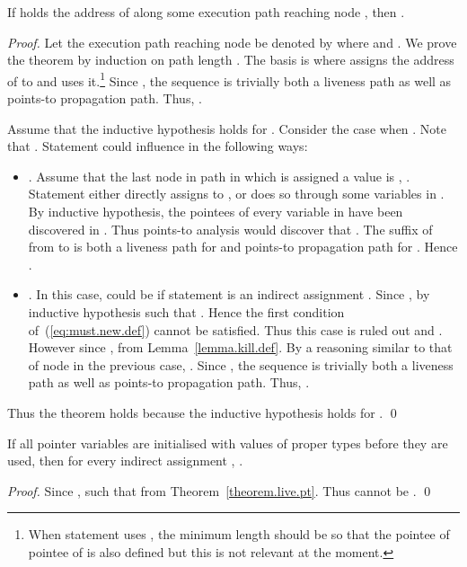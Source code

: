 \documentclass{llncs}
\newcommand{\pointer}{\text{\sf\bfseries\em P}\xspace}
\newcommand{\pt}[2]{\text{}}
\begin{document}
\begin{theorem}
\label{theorem.live.pt}
If \text{} holds the address of \text{}
along some execution path reaching node , then \text{}.
\end{theorem}
\begin{proof}
Let the execution path reaching node  be denoted by \text{} where \text{} and
\text{}. We prove the theorem by induction on path length
. The basis is  where  assigns the address of  to 
and  uses it.\footnote{When statement  uses , the minimum
length should be  so that the pointee of pointee of  is also
defined but this is not relevant at the moment.} Since \text{}, the sequence  is trivially both a liveness
path as well as points-to propagation path. Thus, \text{}.

Assume that the inductive hypothesis holds for . Consider the case
when . Note that \text{}. Statement 
could influence  in the following ways:
\begin{itemize}
\item \text{}. Assume that the last node in
      path  in which  is assigned a value is , \text{}. Statement  either directly assigns  to , or
      does so through some variables in . By inductive
      hypothesis, the pointees of every variable in  have
      been discovered in . Thus points-to analysis would
      discover that \text{}. The suffix
      of  from  to  is both a liveness path
      for  and points-to propagation path for \pt{x}{z}. Hence
      \text{}.
\item \text{}. In this case,  could be
      \pointer if statement  is an indirect assignment \text{}. Since \text{}, by inductive hypothesis
      \text{} such that \text{}.
      Hence the first condition of~(\ref{eq:must.new.def}) cannot be
      satisfied. Thus this case is ruled out and \text{}. However since \text{}, \text{} from
      Lemma~\ref{lemma.kill.def}. By a reasoning similar to that of node
       in the previous case, \text{}.
      Since \text{}, the sequence  is
      trivially both a liveness path as well as points-to propagation
      path. Thus, \text{}.
\end{itemize}
Thus the theorem holds because the inductive hypothesis holds for .
\qed
\end{proof}

\begin{corollary}
\label{cor.def.not.empty}
If all pointer variables are initialised with values of proper types
before they are used, then for every indirect assignment \text{},
\text{}.
\end{corollary}
\begin{proof}
Since \text{}, \text{} such that \text{}
from Theorem~\ref{theorem.live.pt}. Thus  cannot be .
\qed
\end{proof}
\end{document}

